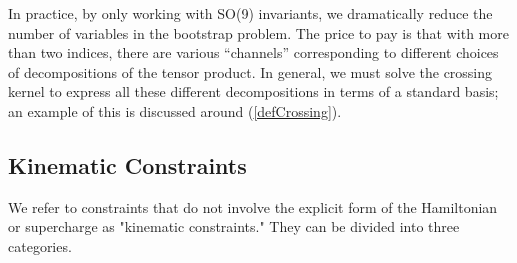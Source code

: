 \documentclass[11pt]{article}
\def\nref#1{(\ref{#1})}
\begin{document}
In practice, by only working with SO(9) invariants, we dramatically reduce the number of variables in the bootstrap problem. The price to pay is that with more than two indices, there are various ``channels'' corresponding to different choices of decompositions of the tensor product. In general, we must solve the crossing kernel to express all these different decompositions in terms of a standard basis; an example of this is discussed around  \nref{defCrossing}.

    



\subsection{Kinematic Constraints}
\def\O{\mathcal{O}}
We refer to constraints that do not involve the explicit form of the Hamiltonian or supercharge as "kinematic constraints." They can be divided into three categories. %
\end{document}
